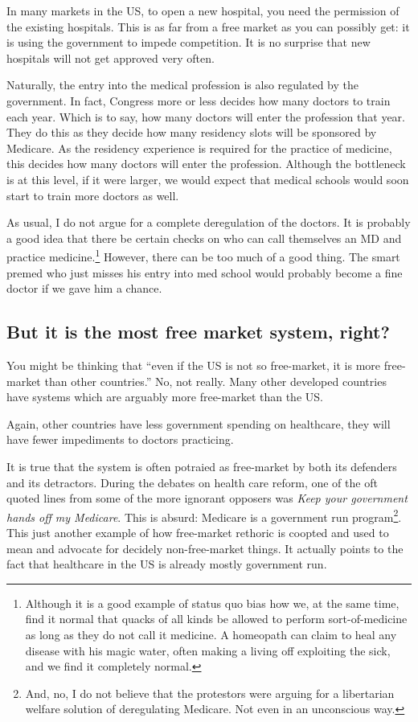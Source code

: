 In many markets in the US, to open a new hospital, you need the permission of
the existing hospitals. This is as far from a free market as you can possibly
get: it is using the government to impede competition. It is no surprise that
new hospitals will not get approved very often.

Naturally, the entry into the medical profession is also regulated by the
government. In fact, Congress more or less decides how many doctors to train
each year. Which is to say, how many doctors will enter the profession that
year. They do this as they decide how many residency slots will be sponsored by
Medicare. As the residency experience is required for the practice of medicine,
this decides how many doctors will enter the profession. Although the
bottleneck is at this level, if it were larger, we would expect that medical
schools would soon start to train more doctors as well.

As usual, I do not argue for a complete deregulation of the doctors. It is
probably a good idea that there be certain checks on who can call themselves an
MD and practice medicine.\footnote{Although it is a good example of status quo
bias how we, at the same time, find it normal that quacks of all kinds be
allowed to perform sort-of-medicine as long as they do not call it medicine. A
homeopath can claim to heal any disease with his magic water, often making a
living off exploiting the sick, and we find it completely normal.} However,
there can be too much of a good thing. The smart premed who just misses his
entry into med school would probably become a fine doctor if we gave him a
chance.

\subsection{But it is the most free market system, right?}

You might be thinking that ``even if the US is not so free-market, it is more
free-market than other countries.'' No, not really. Many other developed
countries have systems which are arguably more free-market than the US.

Again, other countries have less government spending on healthcare, they will
have fewer impediments to doctors practicing.

It is true that the system is often potraied as free-market by both its
defenders and its detractors. During the debates on health care reform, one of
the oft quoted lines from some of the more ignorant opposers was \emph{Keep
your government hands off my Medicare}. This is absurd: Medicare is a
government run program\footnote{And, no, I do not believe that the protestors
were arguing for a libertarian welfare solution of deregulating Medicare. Not
even in an unconscious way.}. This just another example of how free-market
rethoric is coopted and used to mean and advocate for decidely non-free-market
things. It actually points to the fact that healthcare in the US is already
mostly government run.


